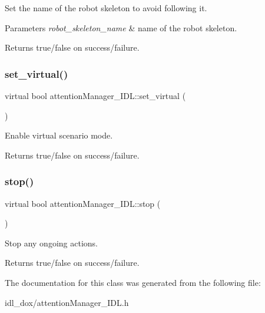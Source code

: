 Set the name of the robot skeleton to avoid following it. 


\begin{DoxyParams}{Parameters}
{\em robot\+\_\+skeleton\+\_\+name} & name of the robot skeleton. \\
\hline
\end{DoxyParams}
\begin{DoxyReturn}{Returns}
true/false on success/failure. 
\end{DoxyReturn}
\mbox{\label{classattentionManager__IDL_a9278a1d0df7c7b1c3b0aa46ef78f8009}} 
\subsubsection{\texorpdfstring{set\_virtual()}{set\_virtual()}}
{\footnotesize\ttfamily virtual bool attention\+Manager\+\_\+\+I\+D\+L\+::set\+\_\+virtual (\begin{DoxyParamCaption}{ }\end{DoxyParamCaption})\hspace{0.3cm}{\ttfamily [virtual]}}



Enable virtual scenario mode. 

\begin{DoxyReturn}{Returns}
true/false on success/failure. 
\end{DoxyReturn}
\mbox{\label{classattentionManager__IDL_aa5e3fb18a0336d8b65c316e7f6a675a8}} 
\subsubsection{\texorpdfstring{stop()}{stop()}}
{\footnotesize\ttfamily virtual bool attention\+Manager\+\_\+\+I\+D\+L\+::stop (\begin{DoxyParamCaption}{ }\end{DoxyParamCaption})\hspace{0.3cm}{\ttfamily [virtual]}}



Stop any ongoing actions. 

\begin{DoxyReturn}{Returns}
true/false on success/failure. 
\end{DoxyReturn}


The documentation for this class was generated from the following file\+:\begin{DoxyCompactItemize}
\item 
idl\+\_\+dox/attention\+Manager\+\_\+\+I\+D\+L.\+h\end{DoxyCompactItemize}
